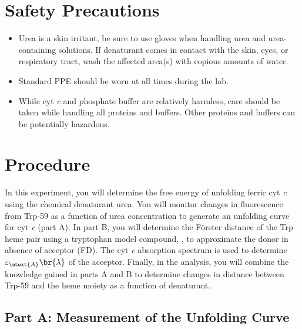 

\section{Safety Precautions} %
\label{sec:safety_precautions}

\begin{itemize}
	\item Urea is a skin irritant, be sure to use gloves when handling urea and urea-containing solutions. If denaturant comes in contact with the skin, eyes, or respiratory tract, wash the affected area(s) with copious amounts of water. 
	\item Standard PPE should be worn at all times during the lab. 
	\item While cyt \emph{c} and phosphate buffer are relatively harmless, care should be taken while handling all proteins and buffers. Other proteins and buffers can be potentially hazardous. 
\end{itemize}


\section{Procedure} %
\label{sec:procedure}

In this experiment, you will determine the free energy of unfolding ferric cyt \emph{c} using the chemical denaturant urea. 
You will monitor changes in fluorescence from Trp-59 as a function of urea concentration to generate an unfolding curve for cyt \emph{c} (part A).  
In part B, you will determine the Förster distance of the Trp--heme pair using a tryptophan model compound, , to approximate the donor in absence of acceptor (FD).  
The cyt \emph{c} absorption spectrum is used to determine \( \varepsilon_\mtext{A} \br{\lambda} \) of the acceptor. 
Finally, in the analysis, you will combine the knowledge gained in parts A and B to determine changes in distance between Trp-59 and the heme moiety as a function of denaturant. 

\subsection{Part A: Measurement of the Unfolding Curve} %
\label{sub:part_a_measurement_of_the_unfolding_curve}

